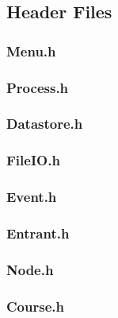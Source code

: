\documentclass[a4paper, 10pt]{article}
\begin{document}
\subsection{Header Files}

\subsubsection{Menu.h}


\clearpage
\subsubsection{Process.h}


\clearpage
\subsubsection{Datastore.h}


\clearpage
\subsubsection{FileIO.h}


\clearpage
\subsubsection{Event.h}


\clearpage
\subsubsection{Entrant.h}


\clearpage
\subsubsection{Node.h}


\clearpage
\subsubsection{Course.h}

\end{document}
